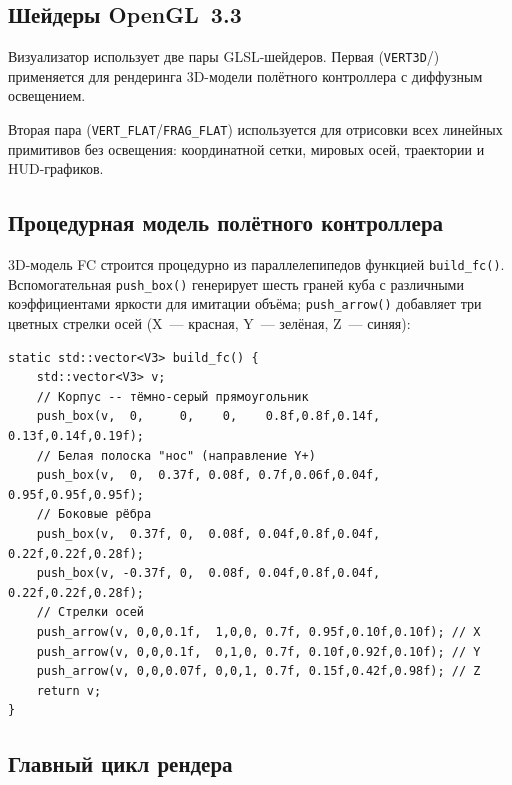 \documentclass[../main.tex]{subfiles}
\begin{document}
\subsection{Шейдеры OpenGL~3.3}
 
Визуализатор использует две пары GLSL-шейдеров. Первая
(\texttt{VERT3D}/) применяется для рендеринга 3D-модели
полётного контроллера с диффузным освещением.
 
Вторая пара (\texttt{VERT\_FLAT}/\texttt{FRAG\_FLAT}) используется для
отрисовки всех линейных примитивов без освещения: координатной сетки,
мировых осей, траектории и HUD-графиков.

\subsection{Процедурная модель полётного контроллера}
 
3D-модель FC строится процедурно из параллелепипедов функцией
\texttt{build\_fc()}. Вспомогательная \texttt{push\_box()} генерирует
шесть граней куба с различными коэффициентами яркости для имитации объёма;
\texttt{push\_arrow()} добавляет три цветных стрелки осей (X~--- красная,
Y~--- зелёная, Z~--- синяя):
 
\begin{lstlisting}[caption={Процедурная сборка модели FC}]
static std::vector<V3> build_fc() {
    std::vector<V3> v;
    // Корпус -- тёмно-серый прямоугольник
    push_box(v,  0,     0,    0,    0.8f,0.8f,0.14f, 0.13f,0.14f,0.19f);
    // Белая полоска "нос" (направление Y+)
    push_box(v,  0,  0.37f, 0.08f, 0.7f,0.06f,0.04f, 0.95f,0.95f,0.95f);
    // Боковые рёбра
    push_box(v,  0.37f, 0,  0.08f, 0.04f,0.8f,0.04f, 0.22f,0.22f,0.28f);
    push_box(v, -0.37f, 0,  0.08f, 0.04f,0.8f,0.04f, 0.22f,0.22f,0.28f);
    // Стрелки осей
    push_arrow(v, 0,0,0.1f,  1,0,0, 0.7f, 0.95f,0.10f,0.10f); // X
    push_arrow(v, 0,0,0.1f,  0,1,0, 0.7f, 0.10f,0.92f,0.10f); // Y
    push_arrow(v, 0,0,0.07f, 0,0,1, 0.7f, 0.15f,0.42f,0.98f); // Z
    return v;
}
\end{lstlisting}
 
\subsection{Главный цикл рендера}
 
\end{document}
